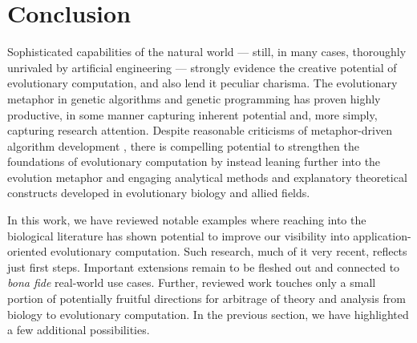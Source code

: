 
\section{Conclusion} \label{sec:conclusion}

Sophisticated capabilities of the natural world --- still, in many cases, thoroughly unrivaled by artificial engineering --- strongly evidence the creative potential of evolutionary computation, and also lend it peculiar charisma.
The evolutionary metaphor in genetic algorithms and genetic programming has proven highly productive, in some manner capturing inherent potential and, more simply, capturing research attention.
Despite reasonable criticisms of metaphor-driven algorithm development \citep{moore2023evolution,sorensen2015metaheuristics}, there is compelling potential to strengthen the foundations of evolutionary computation by instead leaning further into the evolution metaphor and engaging analytical methods and explanatory theoretical constructs developed in evolutionary biology and allied fields.

In this work, we have reviewed notable examples where reaching into the biological literature has shown potential to improve our visibility into application-oriented evolutionary computation.
Such research, much of it very recent, reflects just first steps.
Important extensions remain to be fleshed out and connected to \textit{bona fide} real-world use cases.
Further, reviewed work touches only a small portion of potentially fruitful directions for arbitrage of theory and analysis from biology to evolutionary computation.
In the previous section, we have highlighted a few additional possibilities.

